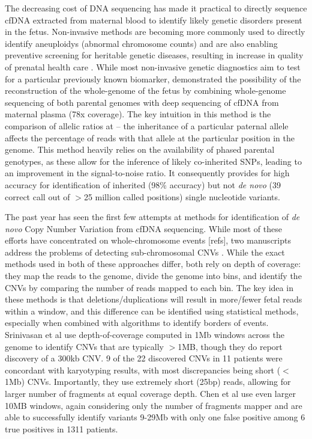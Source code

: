 The decreasing cost of DNA sequencing has made it practical to directly sequence cfDNA extracted from maternal blood to identify likely genetic disorders present in the fetus.  Non-invasive methods are becoming more commonly used to directly identify aneuploidys (abnormal chromosome counts) and are also enabling preventive screening for heritable genetic diseases, resulting in increase in quality of prenatal health care \cite{saunders2012}.  While most non-invasive genetic diagnostics aim to test for a particular previously known biomarker,  \cite{kitzman2012} demonstrated the possibility of the reconstruction of the whole-genome of the fetus by combining whole-genome sequencing of both parental genomes with deep sequencing of cfDNA from maternal plasma (78x coverage). The key intuition in this method is the comparison of allelic ratios at  -- the inheritance of a particular paternal allele affects the percentage of reads with that allele at the particular position in the genome.  This method heavily relies on the availability of phased parental genotypes, as these allow for the inference of likely co-inherited SNPs, leading to an improvement in the signal-to-noise ratio. It consequently provides for high accuracy for identification of inherited (98\% accuracy) but not \emph{de novo}  (39 correct call out of $>$25 million called positions) single nucleotide variants.

The past year has seen the first few attempts at methods for identification of \emph{de novo}  Copy Number Variation from cfDNA sequencing. While most of these efforts have concentrated on whole-chromosome events \cite{chu2009} [refs], two manuscripts address the problems of detecting sub-chromosomal CNVs \cite{chen2013, srinivasan2013}. While the exact methods used in both of these approaches differ, both rely on depth of coverage:  they map the reads to the genome, divide the genome into bins, and identify the CNVs by comparing the number of reads mapped to each bin. The key idea in these methods is that deletions/duplications will result in more/fewer fetal reads within a window, and this difference can be identified using statistical methods, especially when combined with algorithms to identify borders of events. Srinivasan et al use depth-of-coverage computed in 1Mb windows across the genome to identify CNVs that are typically $>$1MB, though they do report discovery of a 300kb CNV. 9 of the 22 discovered CNVs in 11 patients were concordant with karyotyping results, with most discrepancies being short ($<$1Mb) CNVs. Importantly, they use extremely short (25bp) reads, allowing for larger number of fragments at equal coverage depth. Chen et al use even larger 10MB windows, again considering only the number of fragments mapper  and are able to successfully identify variants 9-29Mb with only one false positive among 6 true positives in 1311 patients.

